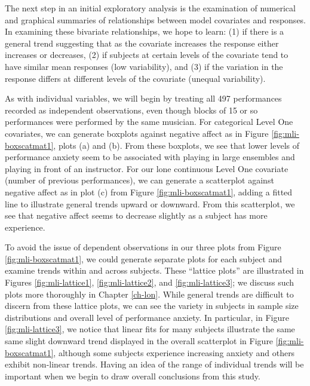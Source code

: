 \documentclass[
]{krantz}
\begin{document}
The next step in an initial exploratory analysis is the examination of numerical and graphical summaries of relationships between model covariates and responses. In examining these bivariate relationships, we hope to learn: (1) if there is a general trend suggesting that as the covariate increases the response either increases or decreases, (2) if subjects at certain levels of the covariate tend to have similar mean responses (low variability), and (3) if the variation in the response differs at different levels of the covariate (unequal variability).

As with individual variables, we will begin by treating all 497 performances recorded as independent observations, even though blocks of 15 or so performances were performed by the same musician. For categorical Level One covariates, we can generate boxplots against negative affect as in Figure \ref{fig:mli-boxscatmat1}, plots (a) and (b). From these boxplots, we see that lower levels of performance anxiety seem to be associated with playing in large ensembles and playing in front of an instructor. For our lone continuous Level One covariate (number of previous performances), we can generate a scatterplot against negative affect as in plot (c) from Figure \ref{fig:mli-boxscatmat1}, adding a fitted line to illustrate general trends upward or downward. From this scatterplot, we see that negative affect seems to decrease slightly as a subject has more experience.

To avoid the issue of dependent observations in our three plots from Figure \ref{fig:mli-boxscatmat1}, we could generate separate plots for each subject and examine trends within and across subjects. These ``lattice plots''  are illustrated in Figures \ref{fig:mli-lattice1}, \ref{fig:mli-lattice2}, and \ref{fig:mli-lattice3}; we discuss such plots more thoroughly in Chapter \ref{ch-lon}. While general trends are difficult to discern from these lattice plots, we can see the variety in subjects in sample size distributions and overall level of performance anxiety. In particular, in Figure \ref{fig:mli-lattice3}, we notice that linear fits for many subjects illustrate the same same slight downward trend displayed in the overall scatterplot in Figure \ref{fig:mli-boxscatmat1}, although some subjects experience increasing anxiety and others exhibit non-linear trends. Having an idea of the range of individual trends will be important when we begin to draw overall conclusions from this study.
\end{document}
